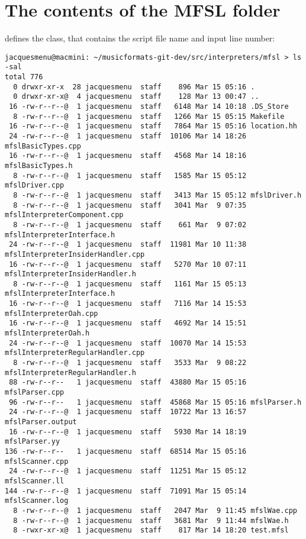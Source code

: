 \section{The contents of the MFSL folder}

 defines the  class, that contains the script file name and input line number:
\begin{lstlisting}[language=TerminalSmall]
jacquesmenu@macmini: ~/musicformats-git-dev/src/interpreters/mfsl > ls -sal
total 776
  0 drwxr-xr-x  28 jacquesmenu  staff    896 Mar 15 05:16 .
  0 drwxr-xr-x@  4 jacquesmenu  staff    128 Mar 13 00:47 ..
 16 -rw-r--r--@  1 jacquesmenu  staff   6148 Mar 14 10:18 .DS_Store
  8 -rw-r--r--@  1 jacquesmenu  staff   1266 Mar 15 05:15 Makefile
 16 -rw-r--r--@  1 jacquesmenu  staff   7864 Mar 15 05:16 location.hh
 24 -rw-r--r--@  1 jacquesmenu  staff  10106 Mar 14 18:26 mfslBasicTypes.cpp
 16 -rw-r--r--@  1 jacquesmenu  staff   4568 Mar 14 18:16 mfslBasicTypes.h
  8 -rw-r--r--@  1 jacquesmenu  staff   1585 Mar 15 05:12 mfslDriver.cpp
  8 -rw-r--r--@  1 jacquesmenu  staff   3413 Mar 15 05:12 mfslDriver.h
  8 -rw-r--r--@  1 jacquesmenu  staff   3041 Mar  9 07:35 mfslInterpreterComponent.cpp
  8 -rw-r--r--@  1 jacquesmenu  staff    661 Mar  9 07:02 mfslInterpreterInterface.h
 24 -rw-r--r--@  1 jacquesmenu  staff  11981 Mar 10 11:38 mfslInterpreterInsiderHandler.cpp
 16 -rw-r--r--@  1 jacquesmenu  staff   5270 Mar 10 07:11 mfslInterpreterInsiderHandler.h
  8 -rw-r--r--@  1 jacquesmenu  staff   1161 Mar 15 05:13 mfslInterpreterInterface.h
 16 -rw-r--r--@  1 jacquesmenu  staff   7116 Mar 14 15:53 mfslInterpreterOah.cpp
 16 -rw-r--r--@  1 jacquesmenu  staff   4692 Mar 14 15:51 mfslInterpreterOah.h
 24 -rw-r--r--@  1 jacquesmenu  staff  10070 Mar 14 15:53 mfslInterpreterRegularHandler.cpp
  8 -rw-r--r--@  1 jacquesmenu  staff   3533 Mar  9 08:22 mfslInterpreterRegularHandler.h
 88 -rw-r--r--   1 jacquesmenu  staff  43880 Mar 15 05:16 mfslParser.cpp
 96 -rw-r--r--   1 jacquesmenu  staff  45868 Mar 15 05:16 mfslParser.h
 24 -rw-r--r--@  1 jacquesmenu  staff  10722 Mar 13 16:57 mfslParser.output
 16 -rw-r--r--@  1 jacquesmenu  staff   5930 Mar 14 18:19 mfslParser.yy
136 -rw-r--r--   1 jacquesmenu  staff  68514 Mar 15 05:16 mfslScanner.cpp
 24 -rw-r--r--@  1 jacquesmenu  staff  11251 Mar 15 05:12 mfslScanner.ll
144 -rw-r--r--@  1 jacquesmenu  staff  71091 Mar 15 05:14 mfslScanner.log
  8 -rw-r--r--@  1 jacquesmenu  staff   2047 Mar  9 11:45 mfslWae.cpp
  8 -rw-r--r--@  1 jacquesmenu  staff   3681 Mar  9 11:44 mfslWae.h
  8 -rwxr-xr-x@  1 jacquesmenu  staff    817 Mar 14 18:20 test.mfsl
\end{lstlisting}


